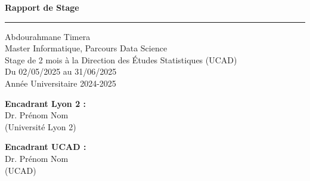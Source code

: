 \documentclass{article}
\begin{document}
\vspace{1.5cm}

\begin{center}
    {\fontsize{38}{44}\selectfont\bfseries Rapport de Stage}\\[0.7em]
    \color{myblue}\rule{0.6\textwidth}{3pt}
\end{center}

\vspace{1cm}

\begin{center}
    {\fontsize{22}{26}\selectfont Abdourahmane Timera}\\[1.5em]
    {\fontsize{16}{20}\selectfont
        Master Informatique, Parcours Data Science\\[0.5em]
        Stage de 2 mois à la Direction des Études Statistiques (UCAD)\\[0.5em]
        Du 02/05/2025 au 31/06/2025\\[0.5em]
        Année Universitaire 2024-2025\\[2em]
    }
\end{center}

\vspace{1cm}

\begin{tcolorbox}[colframe=myblue, colback=white, boxrule=0.8pt, arc=4pt, width=0.9\textwidth, left=0.5cm, right=0.5cm]
    \begin{minipage}{0.45\textwidth}
        \raggedright
        \textbf{Encadrant Lyon 2 :}\\
        Dr. Prénom Nom\\
        (Université Lyon 2)
    \end{minipage}
    \hfill
    \begin{minipage}{0.45\textwidth}
        \raggedleft
        \textbf{Encadrant UCAD :}\\
        Dr. Prénom Nom\\
        (UCAD)
    \end{minipage}
\end{tcolorbox}

\vfill
\end{document}

